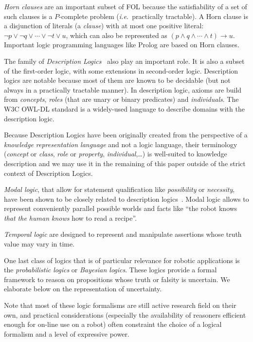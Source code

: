 \documentclass[a4paper, twocolumn]{article}
\newcommand{\ie}{{\textit{i.e.\ }}}
\begin{document}
\emph{Horn clauses} are an important subset of FOL because the satisfiability
of a set of such clauses is a $P$-complete problem (\ie practically tractable).
A Horn clause is a disjunction of literals (a \emph{clause}) with at most one
positive literal: $\neg p \lor \neg q \lor \cdots \lor \neg t \lor u$, which
can also be represented as $(p \land q \land \cdots \land t) \rightarrow u$.
Important logic programming languages like Prolog are based on Horn clauses.

The family of \emph{Description Logics}~\cite{Baader2008} also play an
important role. It is also a subset of the first-order logic, with some
extensions in second-order logic. Description logics are notable because most
of them are known to be decidable (but not always in a practically tractable
manner). In description logic, axioms are build from \emph{concepts},
\emph{roles} (that are unary or binary predicates) and \emph{individuals}. The
W3C OWL-DL standard is a widely-used language to describe domains with the
description logic.

Because Description Logics have been originally created from the perspective of
a \emph{knowledge representation language} and not a logic language, their
terminology (\emph{concept} or \emph{class}, \emph{role} or \emph{property},
\emph{individual},\ldots) is well-suited to knowledge description and we may use
it in the remaining of this paper outside of the strict context of  Description
Logics.

\emph{Modal logic}, that allow for statement qualification like
\emph{possibility} or \emph{necessity}, have been shown to be closely related
to description logics~\cite{Baader2001}. Modal logic allows to represent conveniently parallel
possible worlds and facts like ``the robot knows \emph{that the human knows}
how to read a recipe''.


\emph{Temporal logic} are designed to represent and manipulate assertions whose
truth value may vary in time.

One last class of logics that is of particular relevance for robotic
applications is the \emph{probabilistic logics} or \emph{Bayesian logics}.
These logics provide a formal framework to reason on propositions whose truth
or falsity is uncertain. We elaborate below on the representation of uncertainty.

Note that most of these logic formalisms are still active research field on
their own, and practical considerations (especially the availability of
reasoners efficient enough for on-line use on a robot) often constraint the
choice of a logical formalism and a level of expressive power.
\end{document}
